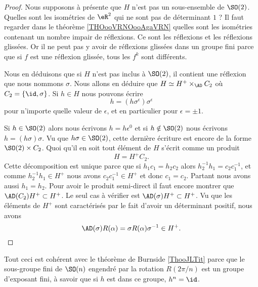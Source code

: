 \begin{proof}
        Nous supposons à présente que \( H\) n'est pas un sous-ensemble de \( \SO(2)\). Quelles sont les isométries de \( \eR^2\) qui ne sont pas de déterminant \( 1\) ? Il faut regarder dans le théorème \ref{THOooVRNOooAgaVRN} quelles sont les isométries contenant un nombre impair de réflexions. Ce sont les réflexions et les réflexions glissées. Or il ne peut pas y avoir de réflexions glissées dans un groupe fini parce que si \( f\) est une réflexion glissée, tous les \( f^k\) sont différents.

        Nous en déduisons que si \( H\) n'est pas inclus à \( \SO(2)\), il contient une réflexion que nous nommons \( \sigma\). Nous allons en déduire que \( H\simeq H^+\times_{\AD}C_2\) où \( C_2=\{ \id,\sigma \}\). Si \( h\in H\) nous pouvons écrire 
        \begin{equation}
            h=(h\sigma^{\epsilon})\sigma^{\epsilon}
        \end{equation}
        pour n'importe quelle valeur de \( \epsilon\), et en particulier pour \( \epsilon=\pm 1\). 

        Si \( h\in \SO(2)\) alors nous écrivons \( h=h\epsilon^{0}\) et si \( h\notin\SO(2)\) nous écrivons \( h=(h\sigma)\sigma\). Vu que \( h\sigma\in\SO(2)\), cette dernière écriture est encore de la forme \( \SO(2)\times C_2\). Quoi qu'il en soit tout élément de \( H\) s'écrit comme un produit 
        \begin{equation}
            H=H^+C_2.
        \end{equation}
        Cette décomposition est unique parce que si \( h_1c_1=h_2c_2\) alors \( h_2^{-1}h_1=c_2c_1^{-1}\), et comme \( h_2^{-1}h_1\in H^+\) nous avons \( c_2c_1^{-1}\in H^+\) et donc \( c_1=c_2\). Partant nous avons aussi \( h_1=h_2\). Pour avoir le produit semi-direct il faut encore montrer que \( \AD(C_2)H^+\subset H^+\). Le seul cas à vérifier est \( \AD(\sigma)H^+\subset H^+\). Vu que les éléments de \( H^+\) sont caractérisés par le fait d'avoir un déterminant positif, nous avons 
        \begin{equation}
            \AD(\sigma)R(\alpha)=\sigma R(\alpha)\sigma^{-1}\in H^+.
        \end{equation}
\end{proof}

\begin{remark}
    Tout ceci est cohérent avec le théorème de Burnside \ref{ThooJLTit} parce que le sous-groupe fini de \( \SO(n)\) engendré par la rotation \( R(2\pi/n)\) est un groupe d'exposant fini, à savoir que si \( h\) est dans ce groupe, \( h^n=\id\).
\end{remark}

